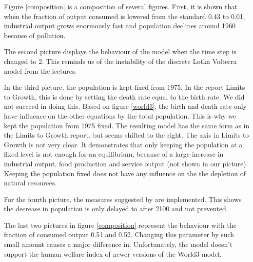 \documentclass[10pt,a4paper]{scrartcl}
\begin{document}
Figure \ref{composition} is a composition of several figures. First, it is shown that when the fraction of output consumed is lowered from the standard 0.43 to 0.01, industrial output grows enormously fast and population declines around 1960 because of pollution.

The second picture displays the behaviour of the model when the time step is changed to 2. This reminds us of the instability of the discrete Lotka Volterra model from the lectures.

In the third picture, the population is kept fixed from 1975. In the report Limits to Growth, this is done by setting the death rate equal to the birth rate. We did not succeed in doing this. Based on figure \ref{world3}, the birth and death rate only have influence on the other equations by the total population. This is why we kept the population from 1975 fixed. The resulting model has the same form as in the Limits to Growth report, but seems shifted to the right. The axis in Limits to Growth is not very clear. It demonstrates that only keeping the population at a fixed level is not enough for an equilibrium, because of a large increase in industrial output, food production and service output (not shown in our picture). Keeping the population fixed does not have any influence on the the depletion of natural resources.

For the fourth picture, the measures suggested by \cite{vermeulen1976parameter} are implemented. This shows the decrease in population is only delayed to after 2100 and not prevented.

The last two pictures in figure \ref{composition} represent the behaviour with the fraction of consumed output 0.51 and 0.52. Changing this parameter by such small amount causes a major difference in. Unfortunately, the model doesn't support the human welfare index of newer versions of the World3 model.
\end{document}
